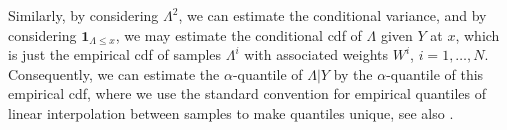 Similarly, by considering $\Lambda^{2}$, we can estimate the conditional variance, and by considering $\mathbf 1 _{\Lambda \leq x}$, we may estimate the conditional \acrlong{cdf} of $\Lambda$ given $Y$ at $x$, which is just the empirical \gls{cdf} of samples $\Lambda^{i}$ with associated weights $W^{i}$, $i = 1,\dots, N$.
Consequently, we can estimate the $\alpha$-quantile of $\Lambda | Y$ by the $\alpha$-quantile of this empirical \gls{cdf}, where we use the standard convention for empirical quantiles of linear interpolation between samples to make quantiles unique, see also \citep[Section 11.5.3]{Durbin2012Time}.